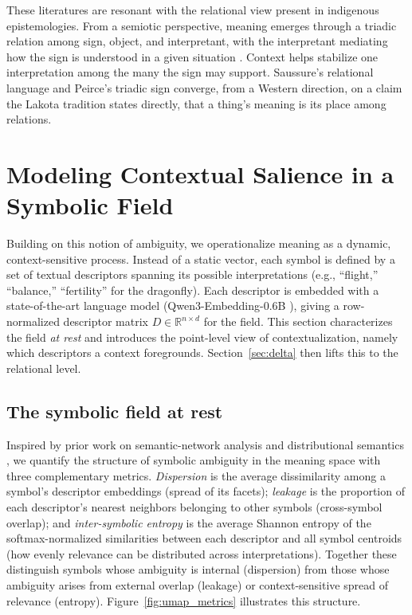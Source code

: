 \documentclass[final,creativeai]{article}
\begin{document}
These literatures are resonant with the relational view present in indigenous epistemologies. From a semiotic perspective, meaning emerges through a triadic relation among sign, object, and interpretant, with the interpretant mediating how the sign is understood in a given situation \citep{kilstrup_naturalizing_2015, smythe_formal_1998, innis_semiotics_1985}. Context helps stabilize one interpretation among the many the sign may support. Saussure's relational language and Peirce's triadic sign converge, from a Western direction, on a claim the Lakota tradition states directly, that a thing's meaning is its place among relations.

\section{Modeling Contextual Salience in a Symbolic Field}
Building on this notion of ambiguity, we operationalize meaning as a dynamic, context-sensitive process. Instead of a static vector, each symbol is defined by a set of textual descriptors spanning its possible interpretations (e.g., ``flight,'' ``balance,'' ``fertility'' for the dragonfly). Each descriptor is embedded with a state-of-the-art language model (Qwen3-Embedding-0.6B \citep{qwen3_embedding_2025}), giving a row-normalized descriptor matrix $D \in \mathbb{R}^{n \times d}$ for the field. This section characterizes the field \emph{at rest} and introduces the point-level view of contextualization, namely which descriptors a context foregrounds. Section~\ref{sec:delta} then lifts this to the relational level.

\subsection{The symbolic field at rest}
Inspired by prior work on semantic-network analysis and distributional semantics \citep{steyvers_large-scale_2005, mikolov_efficient_2013, arora_simple_2017}, we quantify the structure of symbolic ambiguity in the meaning space with three complementary metrics. \emph{Dispersion} is the average dissimilarity among a symbol's descriptor embeddings (spread of its facets); \emph{leakage} is the proportion of each descriptor's nearest neighbors belonging to other symbols (cross-symbol overlap); and \emph{inter-symbolic entropy} is the average Shannon entropy of the softmax-normalized similarities between each descriptor and all symbol centroids (how evenly relevance can be distributed across interpretations). Together these distinguish symbols whose ambiguity is internal (dispersion) from those whose ambiguity arises from external overlap (leakage) or context-sensitive spread of relevance (entropy). Figure~\ref{fig:umap_metrics} illustrates this structure.
\end{document}
